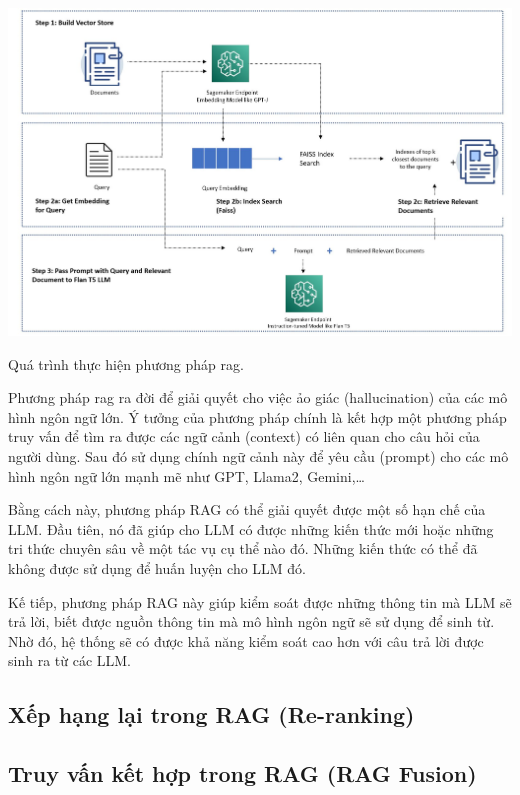 \documentclass[a4paper, 12pt, openany]{book}
\begin{document}
\begin{minipage}{\linewidth}
    \centering
    \includegraphics[width=14cm]{./assets/images/RAG-procedure.jpg}
    \captionsetup{type=figure}
    \caption{Quá trình thực hiện phương pháp \ac{rag}.}
\end{minipage}

\vspace{0.2cm}

Phương pháp \ac{rag} ra đời để giải quyết cho việc ảo giác (hallucination) của các
mô hình ngôn ngữ lớn. Ý tưởng của phương pháp chính là kết hợp một phương pháp truy vấn
để tìm ra được các ngữ cảnh (context) có liên quan cho câu hỏi của người dùng. Sau đó sử dụng chính 
ngữ cảnh này để yêu cầu (prompt) cho các mô hình ngôn ngữ lớn mạnh mẽ như GPT, Llama2, Gemini,\dots

Bằng cách này, phương pháp RAG có thể giải quyết được một số hạn chế của LLM. Đầu tiên, nó đã giúp cho
LLM có được những kiến thức mới hoặc những tri thức chuyên sâu về một tác vụ cụ thể nào đó. Những kiến thức có thể đã không được
sử dụng để huấn luyện cho LLM đó.

Kế tiếp, phương pháp RAG này giúp kiểm soát được những thông tin mà LLM sẽ trả lời, biết được nguồn thông tin mà mô
hình ngôn ngữ sẽ sử dụng để sinh từ. Nhờ đó, hệ thống sẽ có được khả năng kiểm soát cao hơn với câu trả lời được sinh ra
từ các LLM.
\subsection{Xếp hạng lại trong RAG (Re-ranking)}

\subsection{Truy vấn kết hợp trong RAG (RAG Fusion)}
\end{document}

